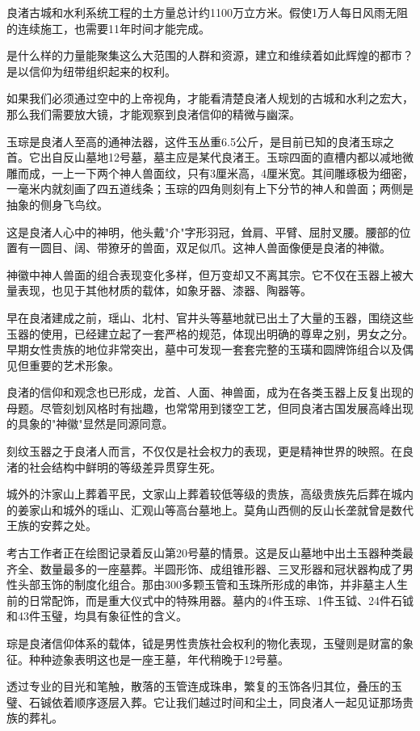 良渚古城和水利系统工程的土方量总计约1100万立方米。假使1万人每日风雨无阻的连续施工，也需要11年时间才能完成。

是什么样的力量能聚集这么大范围的人群和资源，建立和维续着如此辉煌的都市？是以信仰为纽带组织起来的权利。

如果我们必须通过空中的上帝视角，才能看清楚良渚人规划的古城和水利之宏大，那么我们需要放大镜，才能观察到良渚信仰的精微与幽深。

玉琮是良渚人至高的通神法器，这件玉丛重6.5公斤，是目前已知的良渚玉琮之首。它出自反山墓地12号墓，墓主应是某代良渚王。玉琮四面的直槽内都以减地微雕而成，一上一下两个神人兽面纹，只有3厘米高，4厘米宽。其间雕琢极为细密，一毫米内就刻画了四五道线条；玉琮的四角则刻有上下分节的神人和兽面；两侧是抽象的侧身飞鸟纹。

这是良渚人心中的神明，他头戴"介"字形羽冠，耸肩、平臂、屈肘叉腰。腰部的位置有一圆目、阔、带獠牙的兽面，双足似爪。这神人兽面像便是良渚的神徽。

神徽中神人兽面的组合表现变化多样，但万变却又不离其宗。它不仅在玉器上被大量表现，也见于其他材质的载体，如象牙器、漆器、陶器等。

早在良渚建成之前，瑶山、北村、官井头等墓地就已出土了大量的玉器，围绕这些玉器的使用，已经建立起了一套严格的规范，体现出明确的尊卑之别，男女之分。早期女性贵族的地位非常突出，墓中可发现一套套完整的玉璜和圆牌饰组合以及偶见但重要的艺术形象。

良渚的信仰和观念也已形成，龙首、人面、神兽面，成为在各类玉器上反复出现的母题。尽管刻划风格时有拙趣，也常常用到镂空工艺，但同良渚古国发展高峰出现的具象的"神徽"显然是同源同意。

刻纹玉器之于良渚人而言，不仅仅是社会权力的表现，更是精神世界的映照。在良渚的社会结构中鲜明的等级差异贯穿生死。

城外的汴家山上葬着平民，文家山上葬着较低等级的贵族，高级贵族先后葬在城内的姜家山和城外的瑶山、汇观山等高台墓地上。莫角山西侧的反山长垄就曾是数代王族的安葬之处。

考古工作者正在绘图记录着反山第20号墓的情景。这是反山墓地中出土玉器种类最齐全、数量最多的一座墓葬。半圆形饰、成组锥形器、三叉形器和冠状器构成了男性头部玉饰的制度化组合。那由300多颗玉管和玉珠所形成的串饰，并非墓主人生前的日常配饰，而是重大仪式中的特殊用器。墓内的4件玉琮、1件玉钺、24件石钺和43件玉璧，均具有象征性的含义。

琮是良渚信仰体系的载体，钺是男性贵族社会权利的物化表现，玉璧则是财富的象征。种种迹象表明这也是一座王墓，年代稍晚于12号墓。

透过专业的目光和笔触，散落的玉管连成珠串，繁复的玉饰各归其位，叠压的玉璧、石铖依着顺序逐层入葬。它让我们越过时间和尘土，同良渚人一起见证那场贵族的葬礼。

